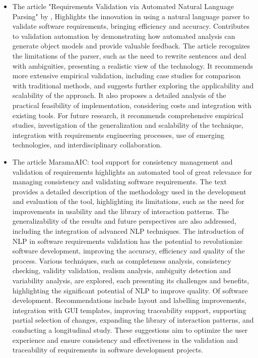 \begin{itemize}
 \item The article "Requirements Validation via Automated Natural Language Parsing" by \cite{nanduri1995}, Highlights the innovation in using a natural language parser to validate software requirements, bringing efficiency and accuracy. Contributes to validation automation by demonstrating how automated analysis can generate object models and provide valuable feedback. The article recognizes the limitations of the parser, such as the need to rewrite sentences and deal with ambiguities, presenting a realistic view of the technology.
 It recommends more extensive empirical validation, including case studies for comparison with traditional methods, and suggests further exploring the applicability and scalability of the approach. It also proposes a detailed analysis of the practical feasibility of implementation, considering costs and integration with existing tools. For future research, it recommends comprehensive empirical studies, investigation of the generalization and scalability of the technique, integration with requirements engineering processes, use of emerging technologies, and interdisciplinary collaboration.
  \item The article MaramaAIC: tool support for consistency management and validation of requirements \cite{kamalrudin2017maramaaic} highlights an automated tool of great relevance for managing consistency and validating software requirements. The text provides a detailed description of the methodology used in the development and evaluation of the tool, highlighting its limitations, such as the need for improvements in usability and the library of interaction patterns. The generalizability of the results and future perspectives are also addressed, including the integration of advanced NLP techniques. The introduction of NLP in software requirements validation has the potential to revolutionize software development, improving the accuracy, efficiency and quality of the process. Various techniques, such as completeness analysis, consistency checking, validity validation, realism analysis, ambiguity detection and variability analysis, are explored, each presenting its challenges and benefits, highlighting the significant potential of NLP to improve quality. Of software development.
 Recommendations include layout and labelling improvements, integration with GUI templates, improving traceability support, supporting partial selection of changes, expanding the library of interaction patterns, and conducting a longitudinal study. These suggestions aim to optimize the user experience and ensure consistency and effectiveness in the validation and traceability of requirements in software development projects.


\end{itemize}
